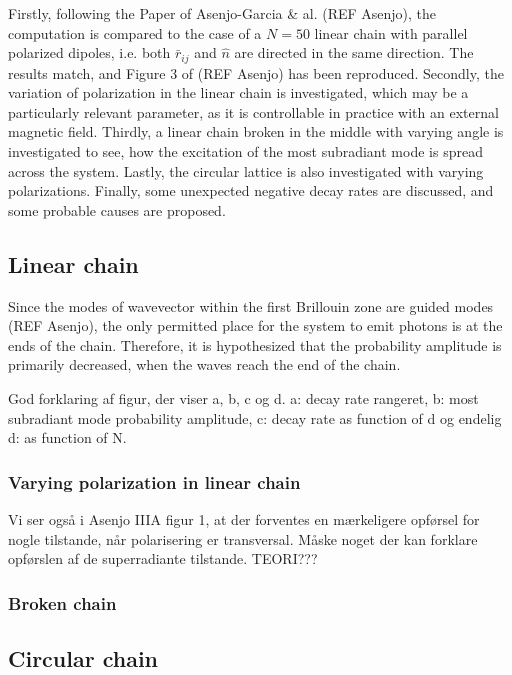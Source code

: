 \documentclass{article}
\begin{document}
Firstly, following the Paper of Asenjo-Garcia \& al. (REF Asenjo), the computation is compared to the case of a $N=50$ linear chain with parallel polarized dipoles, i.e. both $\bar{r}_{ij}$ and $\hat{n}$ are directed in the same direction. The results match, and Figure 3 of (REF Asenjo) has been reproduced. Secondly, the variation of polarization in the linear chain is investigated, which may be a particularly relevant parameter, as it is controllable in practice with an external magnetic field. Thirdly, a linear chain broken in the middle with varying angle is investigated to see, how the excitation of the most subradiant mode is spread across the system. Lastly, the circular lattice is also investigated with varying polarizations. Finally, some unexpected negative decay rates are discussed, and some probable causes are proposed. 

\subsection{Linear chain}\label{disc:linear_chain}

Since the modes of wavevector within the first Brillouin zone are guided modes (REF Asenjo), the only permitted place for the system to emit photons is at the ends of the chain. Therefore, it is hypothesized that the probability amplitude is primarily decreased, when the waves reach the end of the chain. 

God forklaring af figur, der viser a, b, c og d. a: decay rate rangeret, b: most subradiant mode probability amplitude, c: decay rate as function of d og endelig d: as function of N. 

\subsubsection{Varying polarization in linear chain}\label{disc:linear_chain_varypola}

Vi ser også i Asenjo IIIA figur 1, at der forventes en mærkeligere opførsel for nogle tilstande, når polarisering er transversal. Måske noget der kan forklare opførslen af de superradiante tilstande. TEORI???

\subsubsection{Broken chain}\label{disc:linear_broken}

\subsection{Circular chain}\label{disc:circular}
\end{document}

